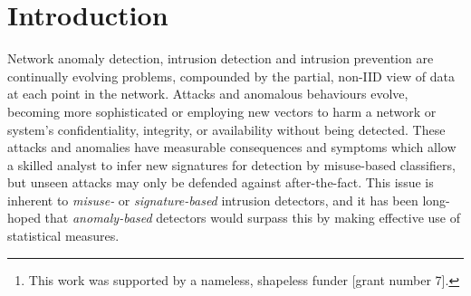 \documentclass[conference, letterpaper, 10pt, times]{IEEEtran}
\title{\mytitle{}}
\author{
Anonymous Giraffe\thanks{This work was supported by a nameless, shapeless funder [grant number 7].},
Anonymous Badger\\
Unnamed Department, Nowhere\\
\email{giraffe.a@unnamed.com}
}
\date{}
\begin{document}

\maketitle

\begin{abstract}
Network intrusion detection and prevention systems backed by machine learning (and the autonomous operation they promise) have been long-heralded, but face problems hampering effective deployment.
The detection problem in this domain is fraught with difficulty; it is an evolving, non-stationary problem as usage patterns shift, new protocols and applications are introduced, and is compounded by burstiness and seasonal variation.

\emph{Reinforcement learning} (RL) may overcome the detection problem for certain classes of anomaly by managing and monitoring \emph{consequences}; an agent's role is to learn to optimise performance criteria (which are always available).

We present...
?? Contribs

?? Taking up space to figure out how much room I have for an intro

?? still taking up space...

?? still going...

?? done...
\end{abstract}

\section{Introduction}

Network anomaly detection, intrusion detection and intrusion prevention are continually evolving problems, compounded by the partial, non-IID view of data at each point in the network.
Attacks and anomalous behaviours evolve, becoming more sophisticated or employing new vectors to harm a network or system's confidentiality, integrity, or availability without being detected.
These attacks and anomalies have measurable consequences and symptoms which allow a skilled analyst to infer new signatures for detection by misuse-based classifiers, but unseen attacks may only be defended against after-the-fact.
This issue is inherent to \emph{misuse-} or \emph{signature-based} intrusion detectors, and it has been long-hoped that \emph{anomaly-based} detectors would surpass this by making effective use of statistical measures.
\end{document}
